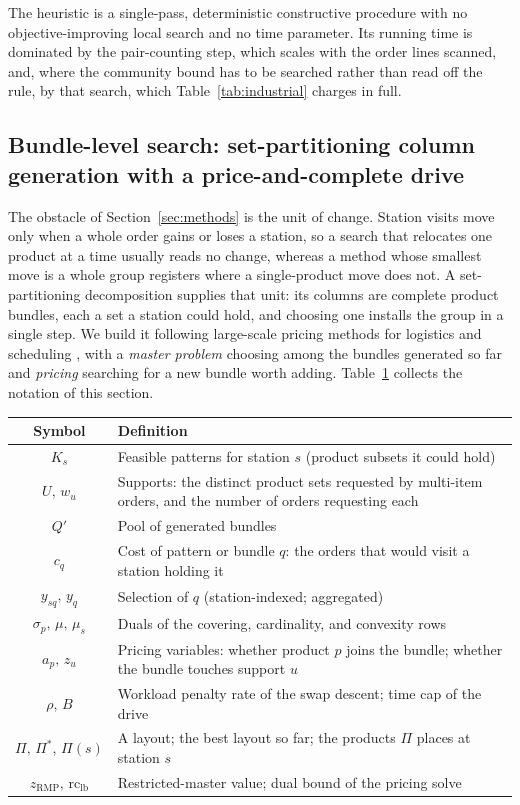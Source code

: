 \documentclass[]{interact}
\begin{document}
The heuristic is a single-pass, deterministic constructive procedure with no objective-improving local search and no time parameter. Its running time is dominated by the pair-counting step, which scales with the order lines scanned, and, where the community bound has to be searched rather than read off the rule, by that search, which Table~\ref{tab:industrial} charges in full.


\subsection{Bundle-level search: set-partitioning column generation with a price-and-complete drive}\label{sec:cg}
The obstacle of Section~\ref{sec:methods} is the unit of change. Station visits move only when a whole order gains or loses a station, so a search that relocates one product at a time usually reads no change, whereas a method whose smallest move is a whole group registers where a single-product move does not. A set-partitioning decomposition supplies that unit: its columns are complete product bundles, each a set a station could hold, and choosing one installs the group in a single step. We build it following large-scale pricing methods for logistics and scheduling \citep{lubbecke2005selected, muter2022}, with a \emph{master problem} choosing among the bundles generated so far and \emph{pricing} searching for a new bundle worth adding. Table~\ref{tab:cgnotation} collects the notation of this section.

\begin{table}[H]
\centering
{}
{\small\begin{tabularx}{\textwidth}{@{}c@{\hspace{2em}}X@{}}
\toprule
Symbol & Definition \\
\midrule
$K_s$       & Feasible patterns for station $s$ (product subsets it could hold) \\
$U,\,w_u$   & Supports: the distinct product sets requested by multi-item orders, and the number of orders requesting each \\
$Q'$        & Pool of generated bundles \\
$c_q$       & Cost of pattern or bundle $q$: the orders that would visit a station holding it \\
$y_{sq},\,y_q$ & Selection of $q$ (station-indexed; aggregated) \\
$\sigma_p,\,\mu,\,\mu_s$ & Duals of the covering, cardinality, and convexity rows \\
$a_p,\,z_u$ & Pricing variables: whether product $p$ joins the bundle; whether the bundle touches support $u$ \\
$\rho,\,B$  & Workload penalty rate of the swap descent; time cap of the drive \\
$\Pi,\,\Pi^{\ast},\,\Pi(s)$ & A layout; the best layout so far; the products $\Pi$ places at station $s$ \\
$z_{\mathrm{RMP}},\,\mathrm{rc}_{\mathrm{lb}}$ & Restricted-master value; dual bound of the pricing solve \\
\bottomrule
\end{tabularx}}
\label{tab:cgnotation}
\end{table}
\end{document}
